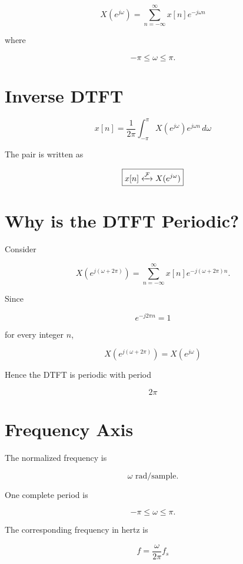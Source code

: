 \[
\boxed{
X(e^{j\omega})=
\sum_{n=-\infty}^{\infty}
x[n]e^{-j\omega n}
}
\]

where

\[
-\pi\le\omega\le\pi.
\]


\section{Inverse DTFT}

\[
\boxed{
x[n]=
\frac{1}{2\pi}
\int_{-\pi}^{\pi}
X(e^{j\omega})e^{j\omega n}\,d\omega
}
\]

The pair is written as

\[
\boxed{
x[n]\xleftrightarrow{\mathcal{F}}X(e^{j\omega})
}
\]


\section{Why is the DTFT Periodic?}

Consider

\[
X(e^{j(\omega+2\pi)})=
\sum_{n=-\infty}^{\infty}
x[n]e^{-j(\omega+2\pi)n}.
\]

Since

\[
e^{-j2\pi n}=1
\]

for every integer \(n\),

\[
\boxed{
X(e^{j(\omega+2\pi)})=X(e^{j\omega})
}
\]

Hence the DTFT is periodic with period

\[
\boxed{
2\pi
}
\]


\section{Frequency Axis}

The normalized frequency is

\[
\omega \text{ rad/sample}.
\]

One complete period is

\[
-\pi\le\omega\le\pi.
\]

The corresponding frequency in hertz is

\[
\boxed{
f=\frac{\omega}{2\pi}f_s
}
\]


